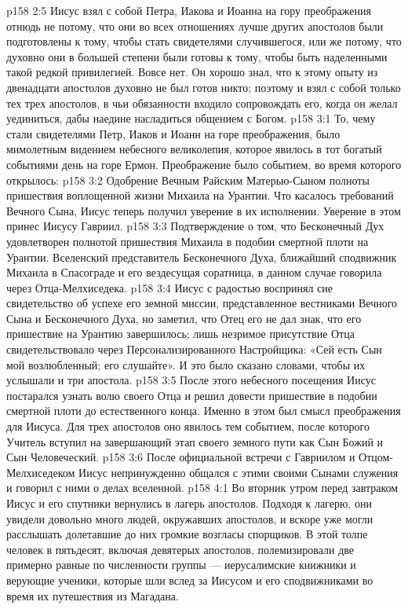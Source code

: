 \vs p158 2:5 Иисус взял с собой Петра, Иакова и Иоанна на гору преображения отнюдь не потому, что они во всех отношениях лучше других апостолов были подготовлены к тому, чтобы стать свидетелями случившегося, или же потому, что духовно они в большей степени были готовы к тому, чтобы быть наделенными такой редкой привилегией. Вовсе нет. Он хорошо знал, что к этому опыту из двенадцати апостолов духовно не был готов никто; поэтому и взял с собой только тех трех апостолов, в чьи обязанности входило сопровождать его, когда он желал уединиться, дабы наедине насладиться общением с Богом.
\vs p158 3:1 То, чему стали свидетелями Петр, Иаков и Иоанн на горе преображения, было мимолетным видением небесного великолепия, которое явилось в тот богатый событиями день на горе Ермон. Преображение было событием, во время которого открылось:
\vs p158 3:2 \bibnobreakspace Одобрение Вечным Райским Матерью\hyp{}Сыном полноты пришествия воплощенной жизни Михаила на Урантии. Что касалось требований Вечного Сына, Иисус теперь получил уверение в их исполнении. Уверение в этом принес Иисусу Гавриил.
\vs p158 3:3 \bibnobreakspace Подтверждение о том, что Бесконечный Дух удовлетворен полнотой пришествия Михаила в подобии смертной плоти на Урантии. Вселенский представитель Бесконечного Духа, ближайший сподвижник Михаила в Спасограде и его вездесущая соратница, в данном случае говорила через Отца\hyp{}Мелхиседека.
\vs p158 3:4 \pc Иисус с радостью воспринял сие свидетельство об успехе его земной миссии, представленное вестниками Вечного Сына и Бесконечного Духа, но заметил, что Отец его не дал знак, что его пришествие на Урантию завершилось; лишь незримое присутствие Отца свидетельствовало через Персонализированного Настройщика: «Сей есть Сын мой возлюбленный; его слушайте». И это было сказано словами, чтобы их услышали и три апостола.
\vs p158 3:5 После этого небесного посещения Иисус постарался узнать волю своего Отца и решил довести пришествие в подобии смертной плоти до естественного конца. Именно в этом был смысл преображения для Иисуса. Для трех апостолов оно явилось тем событием, после которого Учитель вступил на завершающий этап своего земного пути как Сын Божий и Сын Человеческий.
\vs p158 3:6 После официальной встречи с Гавриилом и Отцом\hyp{}Мелхиседеком Иисус непринужденно общался с этими своими Сынами служения и говорил с ними о делах вселенной.
\vs p158 4:1 Во вторник утром перед завтраком Иисус и его спутники вернулись в лагерь апостолов. Подходя к лагерю, они увидели довольно много людей, окружавших апостолов, и вскоре уже могли расслышать долетавшие до них громкие возгласы спорщиков. В этой толпе человек в пятьдесят, включая девятерых апостолов, полемизировали две примерно равные по численности группы --- иерусалимские книжники и верующие ученики, которые шли вслед за Иисусом и его сподвижниками во время их путешествия из Магадана.
